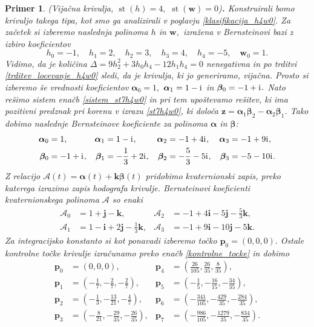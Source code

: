 \documentclass[12pt,a4paper,twoside]{article}
\newcommand{\iu}{\mathrm{i}\mkern1mu} %
\theoremstyle{definition} %
\theoremstyle{plain} %
\theoremstyle{primerstyle}
\newtheorem{primer}[definicija]{Primer}
\numberwithin{equation}{section}  %
\newcommand{\pV}{\mathbf{p}}
\newcommand{\iV}{\mathbf{i}}
\newcommand{\jV}{\mathbf{j}}
\newcommand{\kV}{\mathbf{k}}
\newcommand{\wV}{\mathbf{w}}
\newcommand{\zV}{\mathbf{z}}
\newcommand{\AQ}{\mathcal{A}}
\newcommand{\balpha}{\boldsymbol \alpha}
\newcommand{\bbeta}{\boldsymbol \beta}
\DeclareMathOperator{\st}{st}
\begin{document}
\begin{primer}
	\label{primer_h4w0_vijacna}
	\textnormal{ }(Vijačna krivulja, $\st(h)=4,$ $\st(\wV)=0$)\textbf{.}
	Konstruirali bomo krivuljo takega tipa, kot smo ga analizirali v poglavju \ref{klasifikacija_h4w0}. Za začetek si izberemo naslednja polinoma $h$ in $\wV,$ izražena v Bernsteinovi bazi z izbiro koeficientov
	\begin{equation*}
		h_0=-1,\quad h_1=2,\quad h_2=3,\quad h_3=4,\quad h_4=-5,\quad \wV_0=1.
	\end{equation*}
	Vidimo, da je količina $\Delta=9h_2^2+3h_0h_4-12h_1h_4=0$ nenegativna in po trditvi \ref{trditev_locevanje_h4w0} sledi, da je krivulja, ki jo generiramo, vijačna. Prosto si izberemo še vrednosti koeficientov $\balpha_0=1,$ $\balpha_1=1-\iu$ in $\bbeta_0=-1+\iu.$ Nato rešimo sistem enačb \eqref{sistem_st7h4w0} in pri tem upoštevamo rešitev, ki ima pozitivni predznak pri korenu v izrazu \eqref{st7h4w0}, ki določa $\zV=\balpha_1\bbeta_2-\balpha_2\bbeta_1$. Tako dobimo naslednje Bernsteinove koeficiente za polinoma $\balpha$ in $\bbeta$:
	\begin{align*}
		\balpha_0&=1,&\balpha_1&=1-\iu,&\balpha_2&=-1+4\iu,&\balpha_3&=-1+9\iu,\\
		\bbeta_0&=-1+\iu,&\bbeta_1&=-\frac{1}{3}+2\iu,&\bbeta_2&=-\frac{5}{3}-5\iu,&\bbeta_3&=-5-10\iu.
	\end{align*}
	Z relacijo $\AQ(t)=\balpha(t)+\kV\bbeta(t)$ pridobimo kvaternionski zapis, preko katerega izrazimo zapis hodografa krivulje. Bernsteinovi koeficienti kvaternionskega polinoma $\AQ$ so enaki
	\begin{align*}
		\AQ_0&=1+\jV-\kV,&\AQ_2&=-1+4\iV-5\jV-\frac{5}{3}\kV,\\
		\AQ_1&=1-\iV+2\jV-\frac{1}{3}\kV,&\AQ_3&=-1+9\iV-10\jV-5\kV.
	\end{align*}
	Za integracijsko konstanto si kot ponavadi izberemo točko $\pV_0=(0,0,0).$ Ostale kontrolne točke krivulje izračunamo preko enačb \eqref{kontrolne_tocke} in dobimo
	\begin{align*}
		\pV_0&=(0,0,0),&\pV_4&=\left(\frac{26}{105},\frac{26}{35},\frac{8}{35}\right),\\
		\pV_1&=\left(-\frac{1}{7},-\frac{2}{7},-\frac{2}{7}\right),&\pV_5&=\left(-\frac{1}{5},-\frac{16}{15},-\frac{34}{35}\right),\\
		\pV_2&=\left(-\frac{1}{3},-\frac{13}{21},-\frac{4}{7}\right),&\pV_6&=\left(-\frac{341}{105},-\frac{429}{35},-\frac{284}{35}\right),\\
		\pV_3&=\left(-\frac{8}{21},-\frac{29}{35},-\frac{26}{35}\right),&\pV_7&=\left(-\frac{986}{105},-\frac{1279}{35},-\frac{834}{35}\right).

\end{align*}
\end{primer}
\end{document}

